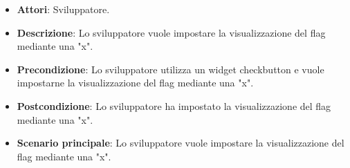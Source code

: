 
\FloatBarrier
\begin{itemize}
\item\textbf{Attori}: Sviluppatore.
\item\textbf{Descrizione}: Lo sviluppatore vuole impostare la visualizzazione del flag mediante una "x".
\item\textbf{Precondizione}: Lo sviluppatore utilizza un widget checkbutton e vuole impostarne la visualizzazione del flag mediante una "x".
\item\textbf{Postcondizione}: Lo sviluppatore ha impostato la visualizzazione del flag mediante una "x".
\item\textbf{Scenario principale}: Lo sviluppatore vuole impostare la visualizzazione del flag mediante una "x".
\end{itemize}
